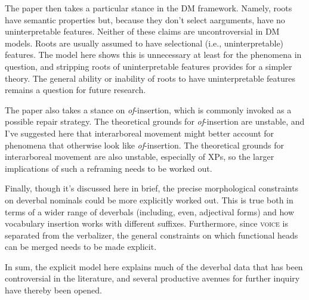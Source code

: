 \documentclass[12pt]{article}
\begin{document}
The paper then takes a particular stance in the DM framework. Namely, roots have semantic properties but, because they don't select aarguments, have no uninterpretable features. Neither of these claims are uncontroversial in DM models. Roots are usually assumed to have selectional (i.e., uninterpretable) features. The model here shows this is unnecessary at least for the phenomena in question, and stripping roots of uninterpretable features provides for a simpler theory. The general ability or inability of roots to have uninterpretable features remains a question for future research.

The paper also takes a stance on \textit{of}-insertion, which is commonly invoked as a possible repair strategy. The theoretical grounds for \textit{of}-insertion are unstable, and I've suggested here that interarboreal movement might better account for phenomena that otherwise look like \textit{of}-insertion. The theoretical grounds for interarboreal movement are also unstable, especially of XPs, so the larger implications of such a reframing needs to be worked out.

Finally, though it's discussed here in brief, the precise morphological constraints on deverbal nominals could be more explicitly worked out. This is true both in terms of a wider range of deverbals (including, even, adjectival forms) and how vocabulary insertion works with different suffixes. Furthermore, since \textsc{voice} is separated from the verbalizer, the general constraints on which functional heads can be merged needs to be made explicit.

In sum, the explicit model here explains much of the deverbal data that has been controversial in the literature, and several productive avenues for further inquiry have thereby been opened.

\singlespacing
\nocite{*}
\printbibliography[heading=bibintoc]
\end{document}
